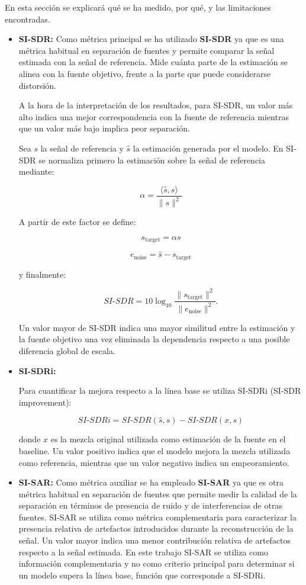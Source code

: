 En esta sección se explicará qué se ha medido, por qué, y las limitaciones encontradas.

\begin{itemize}
    \item \textbf{SI-SDR:}
Como métrica principal se ha utilizado \textbf{SI-SDR} ya que es una métrica habitual en separación de fuentes y permite comparar la señal estimada
con la señal de referencia. Mide cuánta parte de la estimación se alinea con la fuente objetivo, frente a la parte que puede considerarse distorsión.

A la hora de la interpretación de los resultados, para SI-SDR, un valor más alto indica una mejor correspondencia con la fuente de referencia mientras que un valor más bajo implica peor separación.

Sea $s$ la señal de referencia y $\hat{s}$ la estimación generada por
el modelo. En SI-SDR se normaliza primero la estimación sobre la señal
de referencia mediante:

\[
\alpha =
\frac{\langle \hat{s}, s \rangle}
{\|s\|^2}
\]

A partir de este factor se define:

\[
s_{\mathrm{target}} = \alpha s
\]

\[
e_{\mathrm{noise}} =
\hat{s} - s_{\mathrm{target}}
\]

y finalmente:

\[
SI\text{-}SDR =
10\log_{10}
\frac{\|s_{\mathrm{target}}\|^2}
{\|e_{\mathrm{noise}}\|^2}.
\]

Un valor mayor de SI-SDR indica una mayor similitud entre la
estimación y la fuente objetivo una vez eliminada la dependencia
respecto a una posible diferencia global de escala.\cite{SI-SDR}

    \item \textbf{SI-SDRi:}

    Para cuantificar la mejora respecto a la línea base se utiliza
SI-SDRi (SI-SDR improvement):

\[
SI\text{-}SDRi =
SI\text{-}SDR(\hat{s},s)
-
SI\text{-}SDR(x,s)
\]

donde $x$ es la mezcla original utilizada como estimación de la fuente
en el baseline. Un valor positivo indica que el modelo mejora la
mezcla utilizada como referencia, mientras que un valor negativo
indica un empeoramiento.

    \item \textbf{SI-SAR:}
Como métrica auxiliar se ha empleado \textbf{SI-SAR} ya que es otra métrica habitual en separación de fuentes que permite medir la calidad de la separación en
términos de presencia de ruido y de interferencias de otras fuentes.
SI-SAR se utiliza como métrica complementaria para caracterizar la presencia relativa de artefactos introducidos durante la reconstrucción de la señal. Un valor mayor indica una menor contribución relativa de artefactos respecto a la señal estimada. En este trabajo SI-SAR se utiliza como información complementaria y no como criterio principal para determinar si un modelo supera la línea base, función que corresponde a SI-SDRi.
    

\end{itemize}
